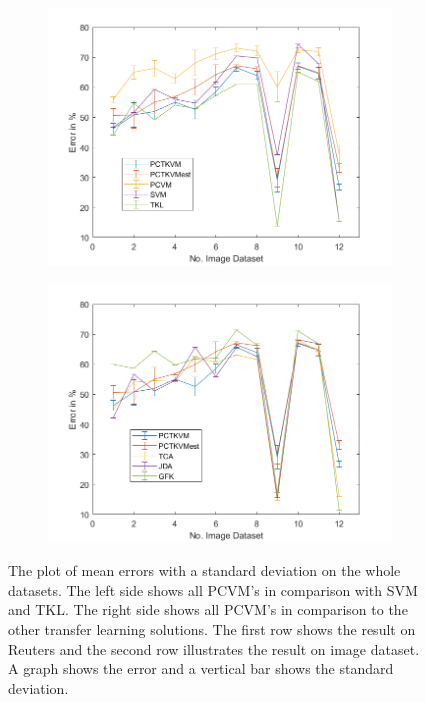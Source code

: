 \begin{figure}[!]
\begin{subfigure}{.5\textwidth}
		\includegraphics[width=1\linewidth]{figures/AverageImage.png}
		\caption{\label{FigErrorAvImTL}}
	\end{subfigure}%
	\begin{subfigure}{.5\textwidth}
		\centering
		\includegraphics[width=1\linewidth]{figures/AverageImageTL.png}
		\caption{\label{FigErrorAvImO}}
	\end{subfigure}
	\caption[Plot of mean Error and standard Deviation on the whole Datasets]{The plot of mean errors with a standard deviation on the whole datasets. The left side shows all \acs{PCVM}'s in comparison with \acs{SVM} and \acs{TKL}. The right side shows all \acs{PCVM}'s in comparison to the other transfer learning solutions. The first row shows the result on Reuters and the second row illustrates the result on image dataset. A graph shows the error and a vertical bar shows the standard deviation. \label{FigErrorAv}}
\end{figure}



